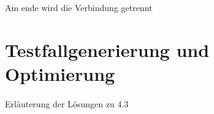 Am ende wird die Verbindung getrennt\\




\newpage
\section{Testfallgenerierung und Optimierung}
\paragraph{}
Erläuterung der Lösungen zu 4.3